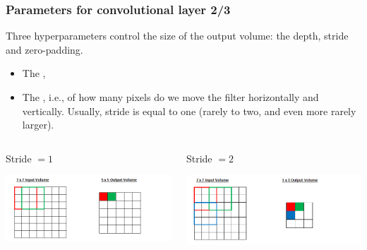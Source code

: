 \begin{frame}
	\frametitle{Parameters for convolutional layer 2/3}
	
	Three hyperparameters control the size of the output volume: the depth, stride and zero-padding.
	
	\bigskip 
	
	\begin{itemize}
		\item The ,
		
		\item The , i.e., of how many pixels do we move the filter horizontally and vertically. Usually, stride is equal to one (rarely to two, and even more rarely larger).
	\end{itemize}

	
	\begin{columns}[T] %
		\hspace{0.2cm}
		\begin{column}{.5\textwidth}
			Stride $=1$
			\begin{center}
				\includegraphics[scale=0.4]{figs/stride1}
			\end{center}
		\end{column}%
		\vrule{}
		\hspace{0.2cm}
		\begin{column}{.5\textwidth}
			Stride $=2$
			\begin{center}
				\includegraphics[scale=0.4]{figs/stride2}
			\end{center}
		\end{column}%
	\end{columns}
	
\end{frame}

